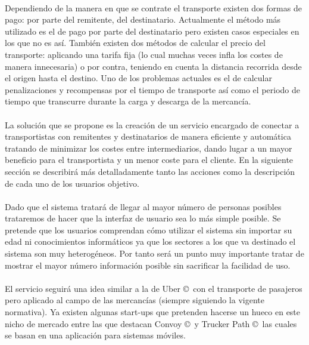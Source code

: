 \documentclass[10pt, a4paper,spanish]{article}
\begin{document}
			\paragraph{}
			Dependiendo de la manera en que se contrate el transporte existen dos formas de pago: por parte del remitente, del destinatario. Actualmente el método más utilizado es el de pago por parte del destinatario pero existen casos especiales en los que no es así. También existen dos métodos de calcular el precio del transporte: aplicando una tarifa fija (lo cual muchas veces infla los costes de manera innecesaria) o por contra, teniendo en cuenta la distancia recorrida desde el origen hasta el destino. Uno de los problemas actuales es el de calcular penalizaciones y recompensas por el tiempo de transporte así como el periodo de tiempo que transcurre durante la carga y descarga de la mercancía.

			\paragraph{}
			La solución que se propone es la creación de un servicio encargado de conectar a transportistas con remitentes y destinatarios de manera eficiente y automática tratando de minimizar los costes entre intermediarios, dando lugar a un mayor beneficio para el transportista y un menor coste para el cliente. En la siguiente sección se describirá más detalladamente tanto las acciones como la descripción de cada uno de los usuarios objetivo.

			\paragraph{}
			Dado que el sistema tratará de llegar al mayor número de personas posibles trataremos de hacer que la interfaz de usuario sea lo más simple posible.
			Se pretende que los usuarios comprendan cómo utilizar el sistema sin importar su edad ni conocimientos informáticos ya que los sectores a los que va destinado el sistema son muy heterogéneos. Por tanto será un punto muy importante tratar de mostrar el mayor número información posible sin sacrificar la facilidad de uso.

			\paragraph{}
			El servicio seguirá una idea similar a la de Uber \copyright\  con el transporte de pasajeros pero aplicado al campo de las mercancías (siempre siguiendo la vigente normativa). Ya existen algunas start-ups que pretenden hacerse un hueco en este nicho de mercado entre las que destacan Convoy \copyright\ y Trucker Path \copyright\ las cuales se basan en una aplicación para sistemas móviles. \cite{expansion_uber_transporte}
\end{document}
